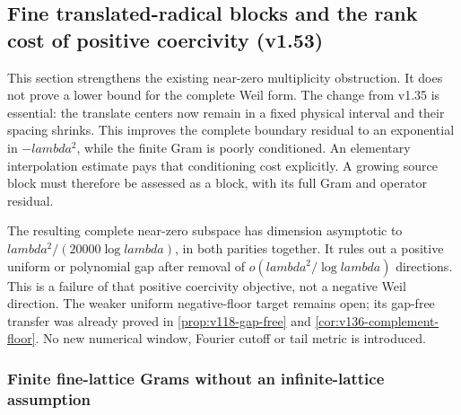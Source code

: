 \documentclass[11pt]{article}
\def\lambda{lambda}%
\theoremstyle{remark}
\begin{document}
\subsection{Fine translated-radical blocks and the rank cost of positive coercivity (v1.53)}
\label{sec:v153-fine-block}
This section strengthens the existing near-zero multiplicity obstruction.
It does not prove a lower bound for the complete Weil form. The change
from v1.35 is essential: the translate centers now remain in a fixed
physical interval and their spacing shrinks. This improves the complete
boundary residual to an exponential in $-\lambda^2$, while the finite
Gram is poorly conditioned. An elementary interpolation estimate pays
that conditioning cost explicitly. A growing source block must therefore
be assessed as a block, with its full Gram and operator residual.

The resulting complete near-zero subspace has dimension asymptotic to
$\lambda^2/(20000\log\lambda)$, in both parities together. It rules out
a positive uniform or polynomial gap after removal of
$o(\lambda^2/\log\lambda)$ directions. This is a failure of that positive
coercivity objective, not a negative Weil direction. The weaker uniform
negative-floor target remains open; its gap-free transfer was already
proved in \ref{prop:v118-gap-free} and \ref{cor:v136-complement-floor}.
No new numerical window, Fourier cutoff or tail metric is introduced.

\subsubsection*{Finite fine-lattice Grams without an infinite-lattice assumption}
\end{document}

